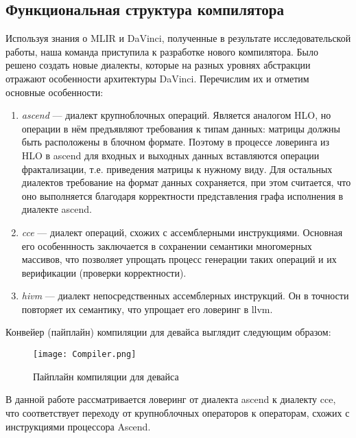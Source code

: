 \subsection{Функциональная структура компилятора}
\label{impl:compiler} %

Используя знания о MLIR и DaVinci, полученные в результате исследовательской
работы, наша команда приступила к разработке нового компилятора. Было решено
создать новые диалекты, которые на разных уровнях абстракции отражают
особенности архитектуры DaVinci. Перечислим их и отметим основные особенности:

\begin{enumerate}
    \item \textit{ascend} --- диалект крупноблочных операций. Является аналогом
          HLO, но операции в нём предъявляют требования к типам данных: матрицы
          должны быть расположены в блочном формате. Поэтому в процессе ловеринга
          из HLO в ascend для входных и выходных данных вставляются операции
          фрактализации, т.е. приведения матрицы к нужному виду. Для остальных
          диалектов требование на формат данных сохраняется, при этом считается,
          что оно выполняется благодаря корректности представления графа
          исполнения в диалекте ascend.

    \item \textit{cce} --- диалект операций, схожих с ассемблерными инструкциями.
          Основная его особеннность заключается в сохранении семантики
          многомерных массивов, что позволяет упрощать процесс генерации таких
          операций и их верификации (проверки корректности).

    \item \textit{hivm} --- диалект непосредственных ассемблерных инструкций. Он в
          точности повторяет их семантику, что упрощает его ловеринг в llvm.
\end{enumerate}

Конвейер (пайплайн) компиляции для девайса выглядит следующим образом:

\begin{figure}[h!]
      \centering
      \texttt{[image: Compiler.png]}
      \caption{Пайплайн компиляции для девайса}
  \end{figure}

В данной работе рассматривается ловеринг от диалекта ascend к диалекту cce,
что соответствует переходу от крупноблочных операторов к операторам, схожих с
инструкциями процессора Ascend.
